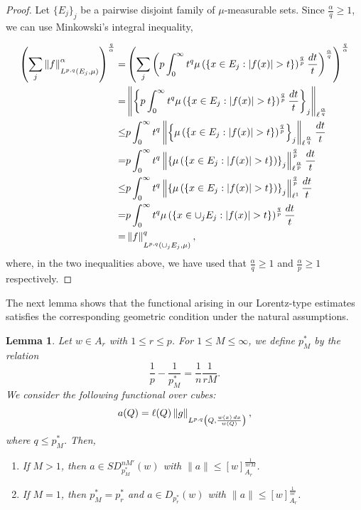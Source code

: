 \documentclass[reqno, 10pt, oneside]{amsart}
\numberwithin{equation}{section}
\newcommand{\strt}[1]{\rule{0pt}{#1}}
\newtheorem{lemma}[theorem]{Lemma}
\numberwithin{theorem}{section}
\newcommand{\1}{{\rm 1\hspace*{-0.4ex}%
\rule{0.1ex}{1.52ex}\hspace*{0.2ex}}}
\begin{document}
	\begin{proof}
		Let $\{E_j\}_j$ be a pairwise disjoint family of $\mu$-measurable sets.  Since $\frac{\alpha}{q}\ge 1$, we can use Minkowski's integral inequality,
		
	\begin{align*}
			\left( \sum_j \left\| f \right\|_{\strt{2.3ex} L^{p,q}\left(E_j , \mu\right)}^\alpha \right)^\frac{q}{\alpha}  = & \left( \sum_j  \left( p \int_0^\infty t^q \mu\left(\{ x\in E_j : |f(x)| > t \} \right)^\frac{q}{p} \frac{dt}{t} \right)^\frac{\alpha}{q} \right)^\frac{q}{\alpha} \\
			= & \left\| \left\{ p \int_0^\infty t^q \mu \left(\{ x\in E_j : |f(x)| > t \} \right)^\frac{q}{p} \frac{dt}{t} \right\}_j \right\|_{\ell^\frac{\alpha}{q}}\\
			\le &  p \int_0^\infty t^q \left\| \left\{\mu\left(\{ x\in E_j : |f(x)| > t \} \right)^\frac{q}{p} \right\}_j \right\|_{\ell^\frac{\alpha}{q}}\frac{dt}{t} \\
			= & p \int_0^\infty t^q \left\| \left\{\mu\left(\{ x\in E_j : |f(x)| > t \} \right) \right\}_j \right\|_{\ell^\frac{\alpha}{p}} ^\frac{q}{p} \frac{dt}{t} \\
			\le & p \int_0^\infty t^q \left\| \left\{\mu\left(\{ x\in E_j : |f(x)| > t \} \right) \right\}_j \right\|_{\ell^1} ^\frac{q}{p} \frac{dt}{t} \\
			= & p \int_0^\infty t^q  \mu \left(\left\{ x\in 	\cup_j E_j : |f(x)| > t \right\} \right) ^\frac{q}{p} \frac{dt}{t} \\
			= & \left\| f \right\|_{\strt{2.3ex} L^{p,q}\left(\cup_j E_j , \mu \right)}^q,
		\end{align*}
		where, in the two inequalities above, we have used that $\frac{\alpha}{q}\ge 1$ and $\frac{\alpha}{p}\ge 1$ respectively.
	\end{proof}


The next lemma shows that the functional arising in our Lorentz-type estimates satisfies the corresponding geometric condition under the natural assumptions.


\begin{lemma}\label{Lemma Lpq SDp}
	Let $w\in A_r$ with $1\le r \le p$. For $1 \le M \le \infty$, we define $p_{M}^*$ by the relation
	\begin{equation*}
		\frac{1}{p}- \frac{1}{p_{M}^*} = \frac{1}{n}\frac{1}{rM}.
	\end{equation*}
We consider the following functional over cubes:	
	\begin{equation*}
		a(Q)= \ell(Q) \left\| g \right\|_{\strt{2.3ex} L^{p,q} \left( Q, \frac{w(x)\, dx}{w(Q)}\right)},
	\end{equation*}
	where $q\le p_{M}^*$. Then,
\begin{enumerate}
 	\item If $M>1$, then $a \in SD_{p_{M}^*}^{nM'}(w)$ with $\|a\|\le [w]_{A_r}^{\frac{1}{nrM}}$.
 	\item If $M=1$, then $p_{M}^*=p_r^{*}$  and $a\in D_{p^*_{r}}(w)$ with $\|a\|\le [w]_{A_r}^{\frac{1}{nr }}$.
 \end{enumerate}
\end{lemma}
\end{document}
